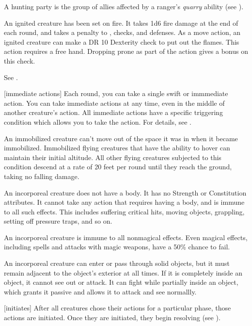  A hunting party is the group of allies affected by a ranger's \textit{quarry} ability (see ).

 An ignited creature has been set on fire.
It takes 1d6 fire damage at the end of each round, and takes a  penalty to , checks, and defenses.
As a move action, an ignited creature can make a DR 10 Dexterity check to put out the flames.
This action requires a free hand.
Dropping prone as part of the action gives a  bonus on this check.

 See .

[immediate actions] Each round, you can take a single swift or immmediate action.
You can take immediate actions at any time, even in the middle of another creature's action.
All immediate actions have a specific triggering condition which allows you to take the action.
For details, see .

 An immobilized creature can't move out of the space it was in when it became immobilized. Immobilized flying creatures that have the ability to hover can maintain their initial altitude. All other flying creatures subjected to this condition descend at a rate of 20 feet per round until they reach the ground, taking no falling damage.

 An incorporeal creature does not have a body.
It has no Strength or Constitution attributes.
It cannot take any action that requires having a body, and is immune to all such effects.
This includes suffering critical hits, moving objects, grappling, setting off pressure traps, and so on.

An incorporeal creature is immune to all nonmagical effects.
Even magical effects, including spells and attacks with magic weapons, have a 50\% chance to fail.

An incorporeal creature can enter or pass through solid objects, but it must remain adjacent to the object's exterior at all times.
If it is completely inside an object, it cannot see out or attack.
It can fight while partially inside an object, which grants it passive  and allows it to attack and see normallly.

[initiates] After all creatures chose their actions for a particular phase, those actions are initiated.
Once they are initiated, they begin resolving (see ).

